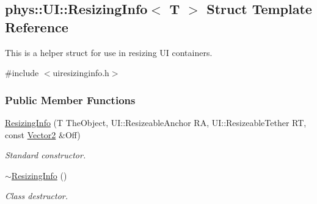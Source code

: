 \hypertarget{structphys_1_1UI_1_1ResizingInfo}{
\subsection{phys::UI::ResizingInfo$<$ T $>$ Struct Template Reference}
\label{d0/d08/structphys_1_1UI_1_1ResizingInfo}
}


This is a helper struct for use in resizing UI containers.  




{\ttfamily \#include $<$uiresizinginfo.h$>$}

\subsubsection*{Public Member Functions}
\begin{DoxyCompactItemize}
\item 
\hyperlink{structphys_1_1UI_1_1ResizingInfo_ae1a05f302e6e8f63773be6daf945f85d}{ResizingInfo} (T TheObject, UI::ResizeableAnchor RA, UI::ResizeableTether RT, const \hyperlink{classphys_1_1Vector2}{Vector2} \&Off)
\begin{DoxyCompactList}\small\item\em Standard constructor. \item\end{DoxyCompactList}\item 
\hypertarget{structphys_1_1UI_1_1ResizingInfo_a4443b66121aff4be05676e11a1bbe987}{
\hyperlink{structphys_1_1UI_1_1ResizingInfo_a4443b66121aff4be05676e11a1bbe987}{$\sim$ResizingInfo} ()}
\label{d0/d08/structphys_1_1UI_1_1ResizingInfo_a4443b66121aff4be05676e11a1bbe987}

\begin{DoxyCompactList}\small\item\em Class destructor. \item\end{DoxyCompactList}\end{DoxyCompactItemize}
